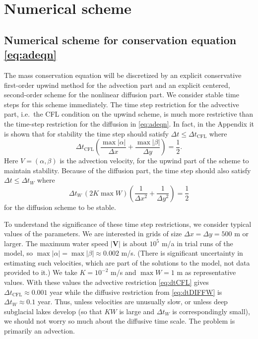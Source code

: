 \documentclass[11pt,final]{amsart}%
\newcommand\bV{\mathbf{V}}
\begin{document}
\section{Numerical scheme}  \label{sec:num}

\subsection*{Numerical scheme for conservation equation \eqref{eq:adeqn}}  The mass conservation equation will be discretized by an explicit conservative first-order upwind method for the advection part and an explicit centered, second-order scheme for the nonlinear diffusion part.  We consider stable time steps for this scheme immediately.  The time step restriction for the advective part, i.e.~the CFL condition on the upwind scheme, is much more restrictive than the time-step restriction for the diffusion in \eqref{eq:adeqn}.  In fact, in the Appendix it is shown that for stability the time step should satisfy $\Delta t \le \Delta t_{\text{CFL}}$ where
\begin{equation}
\Delta t_{\text{CFL}} \left(\frac{\max |\alpha|}{\Delta x} + \frac{\max |\beta|}{\Delta y}\right) = \frac{1}{2}. \label{eq:dtCFL}
\end{equation}
Here $V=(\alpha,\beta)$ is the advection velocity, for the upwind part of the scheme to maintain stability.  Because of the diffusion part, the time step should also satisfy $\Delta t \le \Delta t_{W}$ where
\begin{equation}
\Delta t_W\, (2 K \max W) \left(\frac{1}{\Delta x^2} + \frac{1}{\Delta y^2}\right) = \frac{1}{2} \label{eq:dtDIFFW}
\end{equation}
for the diffusion scheme to be stable.

To understand the significance of these time step restrictions, we consider typical values of the parameters.  We are interested in grids of size $\Delta x = \Delta y = 500$ m or larger.  The maximum water speed $|\bV|$ is about $10^5$ m/a in trial runs of the model, so $\max |\alpha| = \max |\beta| \approx 0.002$ m/s.  (There is significant uncertainty in estimating such velocities, which are part of the solutions to the model, not data provided to it.)  We take $K=10^{-2}$ m/s and $\max W=1$ m as representative values.  With these values the advective restriction \eqref{eq:dtCFL} gives $\Delta t_{\text{CFL}} \approx 0.001$ year while the diffusive restriction from \eqref{eq:dtDIFFW} is $\Delta t_W \approx 0.1$ year.  Thus, unless velocities are unusually slow, or unless deep subglacial lakes develop (so that $KW$ is large and $\Delta t_W$ is correspondingly small), we should not worry so much about the diffusive time scale.  The problem is primarily an advection.
\end{document}
